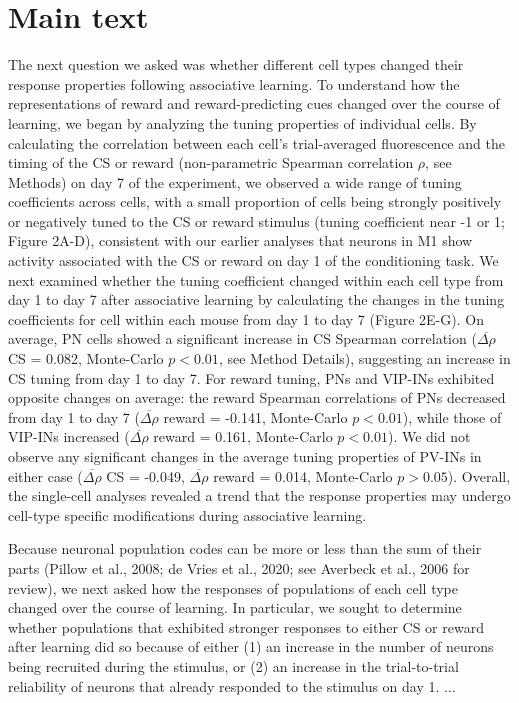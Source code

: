\documentclass{article}
\begin{document}
\section{Main text}

The next question we asked was whether different cell types changed their
response properties following associative learning. To understand how the
representations of reward and reward-predicting cues changed over the course of
learning, we began by analyzing the tuning properties of individual cells.  By
calculating the correlation between each cell's trial-averaged fluorescence and
the timing of the CS or reward (non-parametric Spearman correlation $\rho$, see
Methods) on day 7 of the experiment, we observed a wide range of tuning
coefficients across cells, with a small proportion of cells being strongly
positively or negatively tuned to the CS or reward stimulus (tuning coefficient
near -1 or 1; Figure 2A-D), consistent with our earlier analyses that neurons in
M1 show activity associated with the CS or reward on day 1 of the conditioning
task. We next examined whether the tuning coefficient changed within each cell
type from day 1 to day 7 after associative learning by calculating the changes
in the tuning coefficients for cell within each mouse from day 1 to day 7
(Figure 2E-G).  On average, PN cells showed a significant increase in CS
Spearman correlation ($\overline{\Delta \rho}$ CS = 0.082, Monte-Carlo $p <
0.01$, see Method Details), suggesting an increase in CS tuning from day 1 to
day 7.  For reward tuning, PNs and VIP-INs exhibited opposite changes on
average: the reward Spearman correlations of PNs decreased from day 1 to day 7
($\overline{\Delta \rho}$ reward = -0.141, Monte-Carlo $p < 0.01$), while those
of VIP-INs increased ($\overline{\Delta \rho}$ reward = 0.161, Monte-Carlo $p <
0.01$). We did not observe any significant changes in the average tuning
properties of PV-INs in either case ($\overline{\Delta \rho}$ CS = -0.049,
$\overline{\Delta \rho}$ reward = 0.014, Monte-Carlo $p > 0.05$). Overall, the
single-cell analyses revealed a trend that the response properties may
undergo cell-type specific modifications during associative learning.

Because neuronal population codes can be more or less than the sum of their
parts (Pillow et al., 2008; de Vries et al., 2020; see Averbeck et al., 2006 for
review), we next asked how the responses of populations of each cell type
changed over the course of learning. In particular, we sought to determine
whether populations that exhibited stronger responses to either CS or reward
after learning did so because of either (1) an increase in the number of neurons
being recruited during the stimulus, or (2) an increase in the trial-to-trial
reliability of neurons that already responded to the stimulus on day 1. ...
\end{document}
